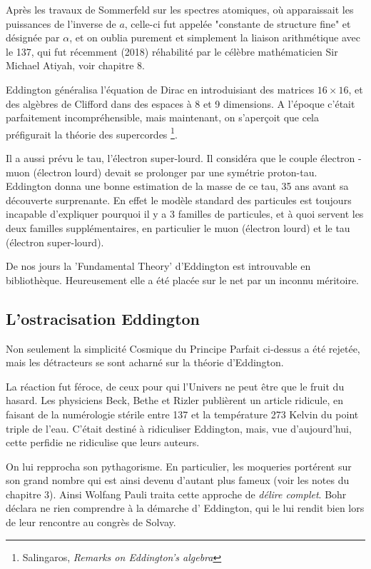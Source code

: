 \documentclass[a4paper,12pt]{article}
\begin{document}
Après les travaux de Sommerfeld sur les spectres atomiques, où apparaissait les puissances de l'inverse de $a$, celle-ci fut appelée "constante de structure fine" et désignée par $\alpha$, et on oublia purement et simplement la liaison arithmétique avec le 137, qui fut récemment (2018) réhabilité par le célèbre mathématicien Sir Michael Atiyah, voir chapitre 8.

Eddington généralisa l'équation de Dirac en introduisiant des matrices $16 \times 16$, et des algèbres de Clifford dans des espaces à 8 et 9 dimensions. A l'époque c'était parfaitement incompréhensible, mais maintenant, on s'aperçoit que cela préfigurait la théorie des supercordes \footnote{Salingaros, \textit{Remarks on Eddington's algebra}}.

Il a aussi prévu le tau, l'électron super-lourd. Il considéra que le couple électron - muon (électron lourd) devait se prolonger par une symétrie proton-tau. Eddington donna une bonne estimation de la masse de ce tau, 35 ans avant sa découverte surprenante. En effet le modèle standard des particules est toujours incapable d'expliquer pourquoi il y a 3 familles de particules, et à quoi servent les deux familles supplémentaires, en particulier le muon (électron lourd) et le tau (électron super-lourd).

De nos jours la 'Fundamental Theory' d'Eddington est introuvable en bibliothèque. Heureusement elle a été placée sur le net par un inconnu méritoire.  



\subsection{L'ostracisation Eddington}
Non seulement la simplicité Cosmique du Principe Parfait ci-dessus a été rejetée, mais les détracteurs se sont acharné sur la théorie d'Eddington.

La réaction fut féroce, de ceux pour qui l'Univers ne peut être que le fruit du hasard. Les physiciens Beck, Bethe et Rizler publièrent un article ridicule, en faisant de la numérologie stérile entre 137 et la température 273 Kelvin du point triple de l'eau. C'était destiné à ridiculiser Eddington, mais, vue d'aujourd'hui, cette perfidie ne ridiculise que leurs auteurs.

On lui repprocha son pythagorisme. En particulier, les moqueries portérent sur son grand nombre qui est ainsi devenu d'autant plus fameux (voir les notes du chapitre 3). Ainsi Wolfang Pauli traita cette approche de \textit{délire complet}. Bohr déclara ne rien comprendre à la démarche d' Eddington, qui le lui rendit bien lors de leur rencontre au congrès de Solvay.
\end{document}
